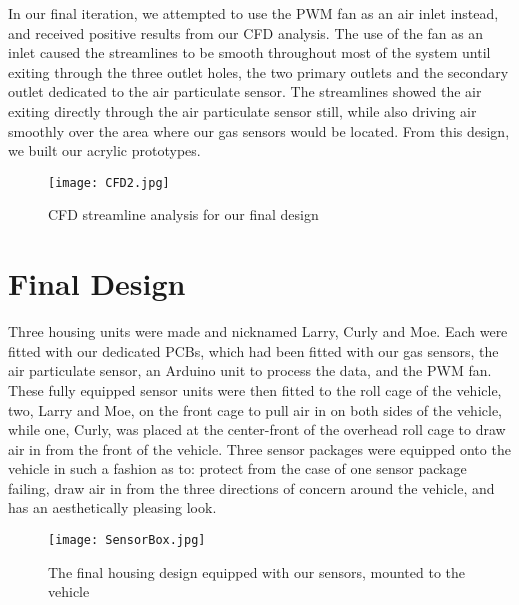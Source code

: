 In our final iteration, we attempted to use the PWM fan as an air inlet instead, and received positive results from our CFD analysis. The use of the fan as an inlet caused the streamlines to be smooth throughout most of the system until exiting through the three outlet holes, the two primary outlets and the secondary outlet dedicated to the air particulate sensor. The streamlines showed the air exiting directly through the air particulate sensor still, while also driving air smoothly over the area where our gas sensors would be located. From this design, we built our acrylic prototypes. 

\begin{figure}[H]
	\centering
	\texttt{[image: CFD2.jpg]}
	\caption{CFD streamline analysis for our final design}
	\label{fig:CFD}
\end{figure}

\section{Final Design}
Three housing units were made and nicknamed Larry, Curly and Moe. Each were fitted with our dedicated PCBs, which had been fitted with our gas sensors, the air particulate sensor, an Arduino unit to process the data, and the PWM fan. These fully equipped sensor units were then fitted to the roll cage of the vehicle, two, Larry and Moe, on the front cage to pull air in on both sides of the vehicle, while one, Curly, was placed at the center-front of the overhead roll cage to draw air in from the front of the vehicle. Three sensor packages were equipped onto the vehicle in such a fashion as to: protect from the case of one sensor package failing, draw air in from the three directions of concern around the vehicle, and has an aesthetically pleasing look.

\begin{figure}[H]
	\centering
	\texttt{[image: SensorBox.jpg]}
	\caption{The final housing design equipped with our sensors, mounted to the vehicle}
	\label{fig:Box}
\end{figure}
